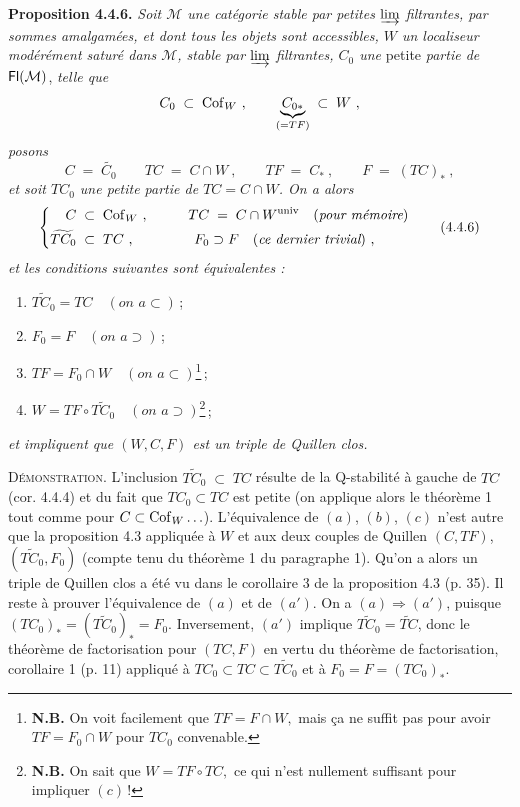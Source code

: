\textbf{Proposition 4.4.6.} \textit{Soit $\mathcal{M}$ une catégorie stable par petites $\varinjlim$ filtrantes, par sommes amalgamées, et dont tous les objets sont accessibles, $W$ un localiseur}
\textit{modérément saturé dans $\mathcal{M}$, stable par $\varinjlim$ filtrantes, $C_0$ une} petite \textit{partie de} $\mathsf{Fl}(\mathcal{M})$, \textit{telle que}
\[
C_0\;\subset\;\mathrm{Cof}_W\ ,\qquad \underbrace{C_{0*}}_{(=TF)}\;\subset\;W\ ,
\]
\textit{posons}
\[
C\;=\;\widetilde{C_0}\qquad TC\;=\;C\cap W\ ,\qquad TF\;=\;C_*\ ,\qquad F\;=\;(TC)_*\ ,
\]
\textit{et soit $TC_0$ une petite partie de $TC=C\cap W$. On a alors}
\[
\left\{
\begin{aligned}
C &\;\subset\;\Cof_W\ , &\qquad TC &\;=\;C\cap W^{\univ}\quad(\textit{pour mémoire})\\
\widetilde{TC_0} &\;\subset\;TC\ , & F_0 &\supset F\quad(\textit{ce dernier trivial})\ ,
\end{aligned}
\right.
\tag*{(4.4.6)}
\]
\textit{et les conditions suivantes sont équivalentes :}
\begin{enumerate}[leftmargin=*]
\item[a)] $\widetilde{TC_0}=TC\quad(\textit{on a}\subset)$\,;
\item[a$'$)] $F_0=F\quad(\textit{on a}\supset)$\,;
\item[b)] $TF=F_0\cap W\quad(\textit{on a}\subset)$\footnote[14]{\textbf{N.B.} On voit facilement que $\boxed{TF=F\cap W,}$ mais ça ne suffit pas pour avoir $TF=F_0\cap W$ pour $TC_0$ convenable.}\,;
\item[c)] $W=TF\circ\widetilde{TC_0}\quad(\textit{on a}\supset)$\footnote[15]{\textbf{N.B.} On sait que $\boxed{W=TF\circ TC,}$ ce qui n'est nullement suffisant pour impliquer $(c)$\,!}\,;
\end{enumerate}
\textit{et impliquent que $(W,C,F)$ est un triple de Quillen clos.}

\textsc{Démonstration.} L'inclusion $\widetilde{TC_0}\;\subset\;TC$ résulte de la Q-stabilité à gauche de $TC$ (cor. 4.4.4) et du fait que $TC_0\subset TC$ est petite (on applique alors le théorème 1 tout comme pour $C\subset\mathrm{Cof}_W\ldots$). L'équivalence de $(a)$, $(b)$, $(c)$ n'est autre que la proposition 4.3 appliquée à $W$ et aux deux couples de Quillen $(C,TF)$, $(\widetilde{TC_0},F_0)$ (compte tenu du théorème 1 du paragraphe 1). Qu'on a alors un triple de Quillen clos a été vu dans le corollaire 3 de la proposition 4.3 (p. 35). Il reste à prouver l'équivalence de $(a)$ et de $(a')$. On a $(a)\Longrightarrow(a')$, puisque $(TC_0)_*=(\widetilde{TC_0})_*=F_0$. Inversement, $(a')$ implique $\widetilde{TC_0}=\widetilde{TC}$, donc le théorème de factorisation pour $(TC,F)$ en vertu du théorème de factorisation, corollaire 1 (p. 11) appliqué à $TC_0\subset TC\subset\widetilde{TC_0}$ et à $F_0=F=(TC_0)_*$.

